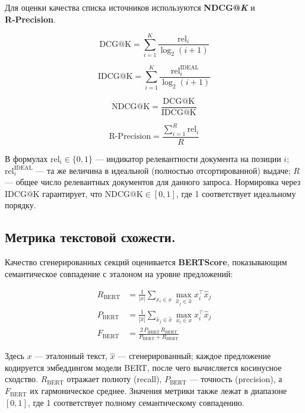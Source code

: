 \documentclass{article}
\theoremstyle{definition}
\theoremstyle{plain}
\begin{document}
Для оценки качества списка источников используются \textbf{NDCG@\textit{K}} и \textbf{R‑Precision}.

\begin{equation}
\mathrm{DCG@K}= \sum_{i=1}^{K} \frac{\mathrm{rel}_i}{\log_2(i+1)}\tag{3}
\end{equation}

\begin{equation}
\mathrm{IDCG@K}= \sum_{i=1}^{K} \frac{\mathrm{rel}^{\mathrm{IDEAL}}_i}{\log_2(i+1)}\tag{4}
\end{equation}

\begin{equation}
\mathrm{NDCG@K}= \frac{\mathrm{DCG@K}}{\mathrm{IDCG@K}}\tag{5}
\end{equation}

\begin{equation}
\mathrm{R\text{-}Precision}= \frac{\sum_{i=1}^{R} \mathrm{rel}_i}{R}\tag{6}
\end{equation}

В формулах \(\mathrm{rel}_i\in\{0,1\}\) — индикатор релевантности документа на позиции \(i\);  
\(\mathrm{rel}^{\mathrm{IDEAL}}_i\) — та же величина в идеальной (полностью отсортированной) выдаче;  
\(R\) — общее число релевантных документов для данного запроса.  
Нормировка через \(\mathrm{IDCG@K}\) гарантирует, что \(\mathrm{NDCG@K}\in[0,1]\), где 1 соответствует идеальному порядку.

\subsection*{Метрика текстовой схожести.}

Качество сгенерированных секций оценивается \textbf{BERTScore}, показывающим семантическое совпадение с эталоном на уровне предложений:

\begin{align}
R_{\mathrm{BERT}} &= \frac{1}{|x|}\sum_{x_i\in x}\max_{\hat{x}_j\in\hat{x}} x_i^\top \hat{x}_j\tag{7}\\
P_{\mathrm{BERT}} &= \frac{1}{|\hat{x}|}\sum_{\hat{x}_j\in\hat{x}}\max_{x_i\in x} x_i^\top \hat{x}_j\tag{8}\\
F_{\mathrm{BERT}} &= \frac{2\,P_{\mathrm{BERT}}\,R_{\mathrm{BERT}}}{P_{\mathrm{BERT}} + R_{\mathrm{BERT}}}\tag{9}
\end{align}

Здесь \(x\) — эталонный текст, \(\hat{x}\) — сгенерированный; каждое предложение кодируется эмбеддингом модели BERT, после чего вычисляется косинусное сходство.  
\(R_{\mathrm{BERT}}\) отражает полноту (recall), \(P_{\mathrm{BERT}}\) — точность (precision), а \(F_{\mathrm{BERT}}\) их гармоническое среднее.  
Значения метрики также лежат в диапазоне \([0,1]\), где 1 соответствует полному семантическому совпадению.
\end{document}
